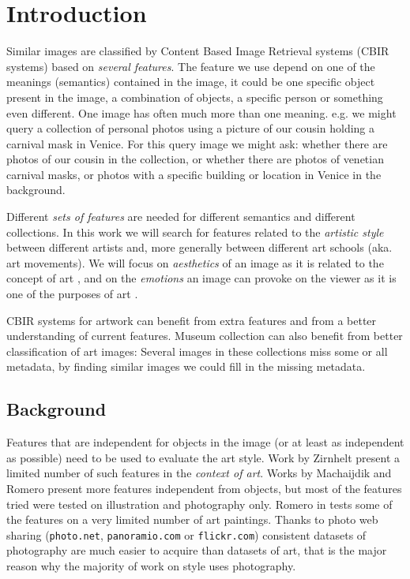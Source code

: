 \documentclass[11pt,a4paper,draft]{report}
\begin{document}
\newpage
\null
\thispagestyle{empty}
\newpage

\newpage
\setcounter{page}{1}

\chapter{Introduction}
\begin{multicols}{2}

Similar images are classified by Content Based Image Retrieval systems (CBIR
systems) based on \emph{several features}.  The feature we use depend on one of
the meanings (semantics) contained in the image, it could be one specific
object present in the image, a combination of objects, a specific person or
something even different.  One image has often much more than one meaning.
e.g. we might query a collection of personal photos using a picture of our
cousin holding a carnival mask in Venice.  For this query image we might ask:
whether there are photos of our cousin in the collection, or whether there are
photos of venetian carnival masks, or photos with a specific building or
location in Venice in the background.

Different \emph{sets of features} are needed for different semantics and
different collections.  In this work we will search for features related to the
\emph{artistic style} between different artists and, more generally between
different art schools (aka. art movements).  We will focus on \emph{aesthetics}
of an image as it is related to the concept of art \cite{rmc12ajs}, and on the
\emph{emotions} an image can provoke on the viewer as it is one of the purposes
of art \cite{mach10clas}.

CBIR systems for artwork \cite{cfsp12air,isv12mpeg,ymvz03tree} can benefit from
extra features and from a better understanding of current features.  Museum
collection can also benefit from better classification of art images:  Several
images in these collections miss some or all metadata, by finding similar
images we could fill in the missing metadata.

\section{Background}

Features that are independent for objects in the image (or at least as
independent as possible) need to be used to evaluate the art style.  Work by
Zirnhelt \cite{zirnhelt07art} present a limited number of such features in the
\emph{context of art}.  Works by Machaijdik \cite{mach10clas} and Romero
\cite{rmc12ajs} present more features independent from objects, but most of the
features tried were tested on illustration and photography only.  Romero in
\cite{rmc12ajs} tests some of the features on a very limited number of art
paintings.  Thanks to photo web sharing (\texttt{photo.net},
\texttt{panoramio.com} or \texttt{flickr.com}) consistent datasets of
photography are much easier to acquire than datasets of art, that is the major
reason why the majority of work on style uses photography.


\end{multicols}
\end{document}
